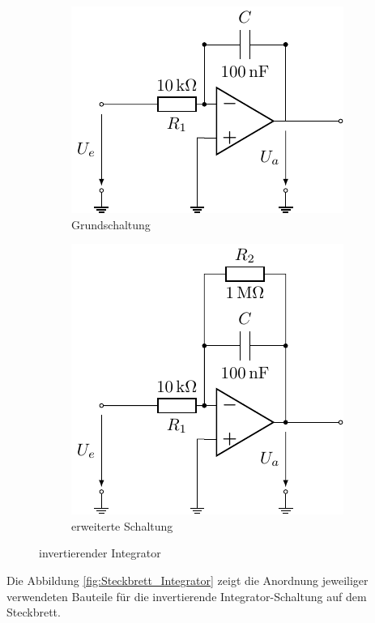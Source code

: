 \begin{figure}[H]
  \centering
  \begin{subfigure}{0.48\textwidth}
   \includegraphics[width=0.7\linewidth]{Elektronik-Laborprotokoll_Filter/Circuits/Integrator.pdf}
  \caption{Grundschaltung}
    \label{fig:circuit_Integrator}
  \end{subfigure}\hfill
  \begin{subfigure}{0.48\textwidth}
\includegraphics[width=0.7\linewidth]{Elektronik-Laborprotokoll_Filter/Circuits/Integrator_erweitert.pdf}
  \caption{erweiterte Schaltung }
  \label{fig:circuit_Integrator_erweitert}
  \end{subfigure}
  \caption{invertierender Integrator}
  \label{fig:invertierender Integrator}
\end{figure}

Die Abbildung \ref{fig:Steckbrett_Integrator} zeigt die Anordnung jeweiliger verwendeten Bauteile für die invertierende Integrator-Schaltung auf dem Steckbrett.

